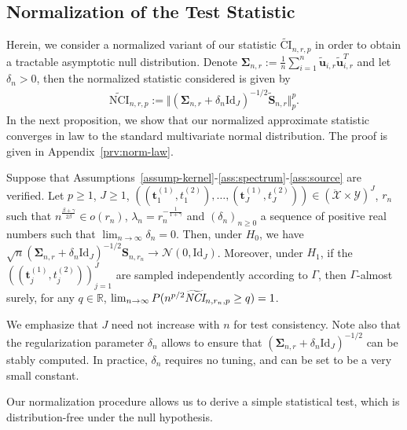 \subsection{Normalization of the Test Statistic} 
Herein, we consider a normalized variant of our statistic $\widetilde{\text{CI}}_{n,r,p}$ in order to obtain a tractable asymptotic null distribution. Denote $\bm{\Sigma}_{n,r}:=\frac{1}{n}\sum_{i=1}^n \widetilde{\bm{u}}_{i,r}\widetilde{\bm{u}}_{i,r}^T$ and let $\delta_n>0$, then the normalized statistic considered is given by
\begin{align*}
    \widetilde{\text{NCI}}_{n,r,p}:=\Vert  (\bm{\Sigma}_{n,r}+\delta_n\text{Id}_J)^{-1/2}\widetilde{\mathbf{S}}_{n,r}\Vert_{p}^p.
\end{align*}
In the next proposition, we show that our normalized approximate statistic converges in law to the standard multivariate normal distribution. The proof is given in Appendix~\ref{prv:norm-law}.
\begin{prop}
\label{prop:norm-law}
Suppose that Assumptions~\ref{assump-kernel}-\ref{ass:spectrum}-\ref{ass:source} are verified. Let $p\geq 1$, $J\geq 1$, $((\mathbf{t}^{(1)}_1,t^{(2)}_1),\dots,(\mathbf{t}^{(1)}_J,t^{(2)}_J))\in(\mathcal{\ddot{X}}\times\mathcal{Y})^J$, $r_n$ such that $n^{\frac{\beta+\gamma}{2\beta}}\in o(r_n)$, $\lambda_n=r_n^{-\frac{1}{1+\gamma}}$ and $(\delta_n)_{n\geq 0}$ a sequence of positive real numbers such that $\lim_{n\rightarrow\infty}\delta_n=0$. Then, under $H_0$, we have $\sqrt{n}(\bm{\Sigma}_{n,r}+\delta_n\text{Id}_J)^{-1/2}\mathbf{S}_{n,r_n}\rightarrow \mathcal{N}(0,\text{Id}_J)$. Moreover, under $H_1$, if the $((\mathbf{t}^{(1)}_j,t^{(2)}_j))_{j=1}^J$ are sampled independently according to $\Gamma$, then $\Gamma$-almost surely, for any $q\in\mathbb{R}$, $\lim_{n\rightarrow\infty}P(n^{p/2}\widetilde{\emph{NCI}}_{n,r_n,p} \geq q)=1$.
\end{prop}

\begin{rmq}
We emphasize that $J$ need not increase with $n$ for test consistency. Note also that the regularization parameter $\delta_n$ allows to ensure that $(\bm{\Sigma}_{n,r}+\delta_n\text{Id}_J)^{-1/2}$ can be stably computed. In practice, $\delta_n$ requires no tuning, and can be set to be a very small constant.
\end{rmq}

Our normalization procedure allows us to derive a simple statistical test, which is distribution-free under the null hypothesis. 


